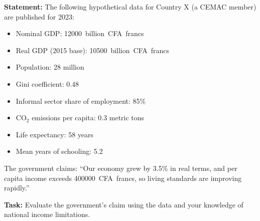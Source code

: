 \documentclass[11pt]{article}
\begin{document}
\begin{exoresolu}
\textbf{Statement:} The following hypothetical data for Country X (a CEMAC member) are published for 2023:
\begin{itemize}
\item Nominal GDP: \SI{12000}{billion CFA francs}
\item Real GDP (2015 base): \SI{10500}{billion CFA francs}
\item Population: 28 million
\item Gini coefficient: 0.48
\item Informal sector share of employment: 85\%
\item CO$_2$ emissions per capita: 0.3 metric tons
\item Life expectancy: 58 years
\item Mean years of schooling: 5.2
\end{itemize}
The government claims: ``Our economy grew by 3.5\% in real terms, and per capita income exceeds \SI{400000}{CFA francs}, so living standards are improving rapidly.''

\textbf{Task:} Evaluate the government's claim using the data and your knowledge of national income limitations.


\end{exoresolu}
\end{document}
